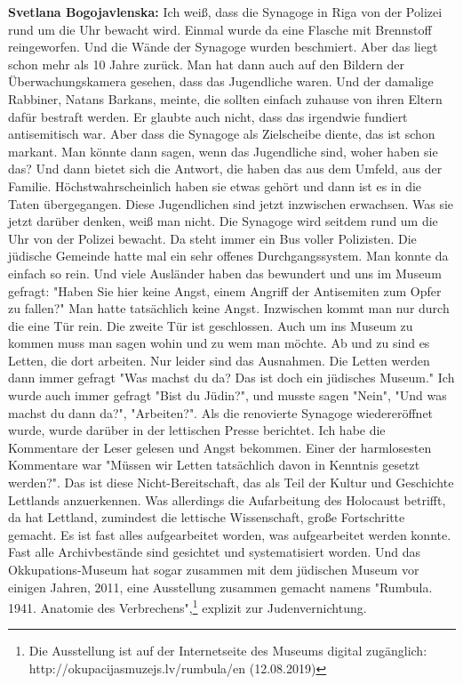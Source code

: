 \textbf{Svetlana Bogojavlenska:} Ich weiß, dass die Synagoge in Riga von der Polizei rund um die Uhr bewacht wird. Einmal wurde da eine Flasche mit Brennstoff reingeworfen. Und die Wände der Synagoge wurden beschmiert. Aber das liegt schon mehr als 10 Jahre zurück. Man hat dann auch auf den Bildern der Überwachungskamera gesehen, dass das Jugendliche waren. Und der damalige Rabbiner, Natans Barkans, meinte, die sollten einfach zuhause von ihren Eltern dafür bestraft werden. Er glaubte auch nicht, dass das irgendwie fundiert antisemitisch war. Aber dass die Synagoge als Zielscheibe diente, das ist schon markant. Man könnte dann sagen, wenn das Jugendliche sind, woher haben sie das? Und dann bietet sich die Antwort, die haben das aus dem Umfeld, aus der Familie. Höchstwahrscheinlich haben sie etwas gehört und dann ist es in die Taten übergegangen. Diese Jugendlichen sind jetzt inzwischen erwachsen. Was sie jetzt darüber denken, weiß man nicht. Die Synagoge wird seitdem rund um die Uhr von der Polizei bewacht. Da steht immer ein Bus voller Polizisten. Die jüdische Gemeinde hatte mal ein sehr offenes Durchgangssystem. Man konnte da einfach so rein. Und viele Ausländer haben das bewundert und uns im Museum gefragt: "Haben Sie hier keine Angst, einem Angriff der Antisemiten zum Opfer zu fallen?" Man hatte tatsächlich keine Angst. Inzwischen kommt man nur durch die eine Tür rein. Die zweite Tür ist geschlossen. Auch um ins Museum zu kommen muss man sagen wohin und zu wem man möchte.
Ab und zu sind es Letten, die dort arbeiten. Nur leider sind das Ausnahmen. Die Letten werden dann immer gefragt "Was machst du da? Das ist doch ein jüdisches Museum." Ich wurde auch immer gefragt "Bist du Jüdin?", und musste sagen "Nein", "Und was machst du dann da?", "Arbeiten?". Als die renovierte Synagoge wiedereröffnet wurde, wurde darüber in der lettischen Presse berichtet. Ich habe die Kommentare der Leser gelesen und Angst bekommen. Einer der harmlosesten Kommentare war "Müssen wir Letten tatsächlich davon in Kenntnis gesetzt werden?". Das ist diese Nicht-Bereitschaft, das als Teil der Kultur und Geschichte Lettlands anzuerkennen.
Was allerdings die Aufarbeitung des Holocaust betrifft, da hat Lettland, zumindest die lettische Wissenschaft, große Fortschritte gemacht. Es ist fast alles aufgearbeitet worden, was aufgearbeitet werden konnte. Fast alle Archivbestände sind gesichtet und systematisiert worden. Und das Okkupations-Museum hat sogar zusammen mit dem jüdischen Museum vor einigen Jahren, 2011, eine Ausstellung zusammen gemacht namens "Rumbula. 1941. Anatomie des Verbrechens",\footnote{Die Ausstellung ist auf der Internetseite des Museums digital zugänglich: http://okupacijasmuzejs.lv/rumbula/en (12.08.2019)} explizit zur Judenvernichtung.

